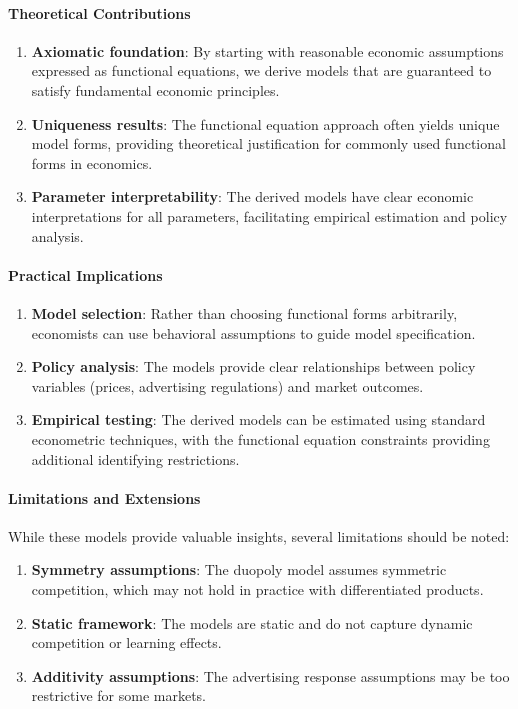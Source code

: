 \paragraph{Theoretical Contributions}
\begin{enumerate}
\item \textbf{Axiomatic foundation}: By starting with reasonable economic assumptions expressed as functional equations, we derive models that are guaranteed to satisfy fundamental economic principles.
\item \textbf{Uniqueness results}: The functional equation approach often yields unique model forms, providing theoretical justification for commonly used functional forms in economics.
\item \textbf{Parameter interpretability}: The derived models have clear economic interpretations for all parameters, facilitating empirical estimation and policy analysis.
\end{enumerate}

\paragraph{Practical Implications}
\begin{enumerate}
\item \textbf{Model selection}: Rather than choosing functional forms arbitrarily, economists can use behavioral assumptions to guide model specification.
\item \textbf{Policy analysis}: The models provide clear relationships between policy variables (prices, advertising regulations) and market outcomes.
\item \textbf{Empirical testing}: The derived models can be estimated using standard econometric techniques, with the functional equation constraints providing additional identifying restrictions.
\end{enumerate}

\paragraph{Limitations and Extensions}
While these models provide valuable insights, several limitations should be noted:

\begin{enumerate}
\item \textbf{Symmetry assumptions}: The duopoly model assumes symmetric competition, which may not hold in practice with differentiated products.
\item \textbf{Static framework}: The models are static and do not capture dynamic competition or learning effects.
\item \textbf{Additivity assumptions}: The advertising response assumptions may be too restrictive for some markets.
\end{enumerate}

